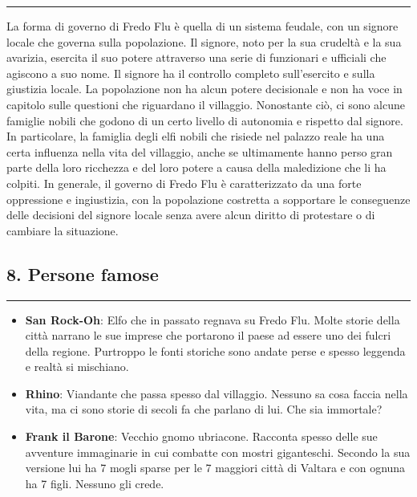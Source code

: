 \begin{center}\rule{0.5\linewidth}{0.5pt}\end{center}

La forma di governo di Fredo Flu è quella di un sistema feudale, con un
signore locale che governa sulla popolazione. Il signore, noto per la
sua crudeltà e la sua avarizia, esercita il suo potere attraverso una
serie di funzionari e ufficiali che agiscono a suo nome. Il signore ha
il controllo completo sull'esercito e sulla giustizia locale. La
popolazione non ha alcun potere decisionale e non ha voce in capitolo
sulle questioni che riguardano il villaggio. Nonostante ciò, ci sono
alcune famiglie nobili che godono di un certo livello di autonomia e
rispetto dal signore. In particolare, la famiglia degli elfi nobili che
risiede nel palazzo reale ha una certa influenza nella vita del
villaggio, anche se ultimamente hanno perso gran parte della loro
ricchezza e del loro potere a causa della maledizione che li ha colpiti.
In generale, il governo di Fredo Flu è caratterizzato da una forte
oppressione e ingiustizia, con la popolazione costretta a sopportare le
conseguenze delle decisioni del signore locale senza avere alcun diritto
di protestare o di cambiare la situazione.

\subsection{8. Persone famose}\label{persone-famose}

\begin{center}\rule{0.5\linewidth}{0.5pt}\end{center}

\begin{itemize}
\tightlist
\item
  \textbf{San Rock-Oh}: Elfo che in passato regnava su Fredo Flu. Molte
  storie della città narrano le sue imprese che portarono il paese ad
  essere uno dei fulcri della regione. Purtroppo le fonti storiche sono
  andate perse e spesso leggenda e realtà si mischiano.
\item
  \textbf{Rhino}: Viandante che passa spesso dal villaggio. Nessuno sa
  cosa faccia nella vita, ma ci sono storie di secoli fa che parlano di
  lui. Che sia immortale?
\item
  \textbf{Frank il Barone}: Vecchio gnomo ubriacone. Racconta spesso
  delle sue avventure immaginarie in cui combatte con mostri
  giganteschi. Secondo la sua versione lui ha 7 mogli sparse per le 7
  maggiori città di Valtara e con ognuna ha 7 figli. Nessuno gli crede.
\end{itemize}
